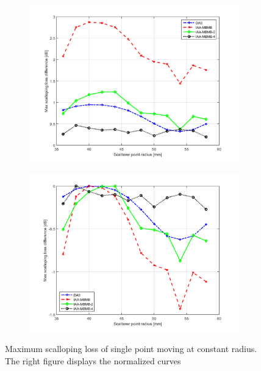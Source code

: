 \begin{figure}[ht]
    \centering
    \begin{subfigure}[t]{0.48\linewidth}
        \includegraphics[width=\linewidth]{./images/discussion/loss_vs_range_upsampled.png}
    \end{subfigure}
    \quad
    \begin{subfigure}[t]{0.48\linewidth}
        \includegraphics[width=\linewidth]{./images/discussion/loss_vs_range_upsampled_diff.png}
    \end{subfigure}
	\caption{Maximum scalloping loss of single point moving at constant radius. The right figure displays the normalized curves}
	\label{fig:loss_vs_range_upsampled}
\end{figure}

